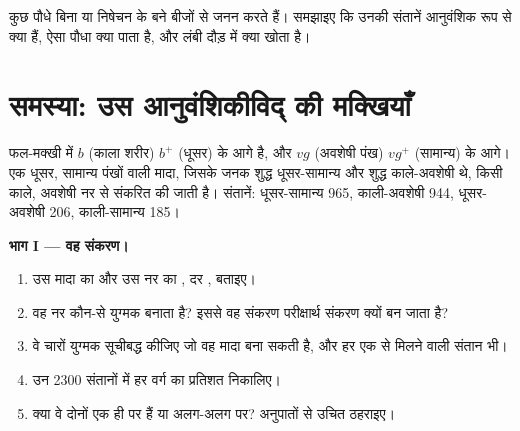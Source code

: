 \begin{exercise}[$\star\star\star$]\label{exo:g12:meiosis-genetic-shuffling:15}
कुछ पौधे बिना  या निषेचन के बने बीजों से जनन करते हैं।
समझाइए कि उनकी संतानें आनुवंशिक रूप से क्या हैं, ऐसा पौधा क्या पाता है, और
लंबी दौड़ में क्या खोता है।
\end{exercise}

\section{समस्या: उस आनुवंशिकीविद् की मक्खियाँ}

\begin{problem}
\label{pb:g12:meiosis-genetic-shuffling:1}
फल-मक्खी में  $b$ (काला शरीर) $b^+$ (धूसर) के आगे  है,
और $vg$ (अवशेषी पंख) $vg^+$ (सामान्य) के आगे। एक धूसर, सामान्य पंखों वाली
मादा, जिसके जनक शुद्ध धूसर-सामान्य और शुद्ध काले-अवशेषी थे, किसी काले,
अवशेषी नर से संकरित की जाती है। संतानें: धूसर-सामान्य 965, काली-अवशेषी 944,
धूसर-अवशेषी 206, काली-सामान्य 185।

\medskip
\noindent\textbf{भाग I --- वह संकरण।}
\begin{enumerate}
  \item उस मादा का और उस नर का ,  दर , बताइए।
  \item वह नर कौन-से युग्मक बनाता है? इससे वह संकरण परीक्षार्थ संकरण क्यों
        बन जाता है?
  \item वे चारों युग्मक सूचीबद्ध कीजिए जो वह मादा बना सकती है, और हर एक से
        मिलने वाली संतान भी।
  \item उन 2300 संतानों में हर वर्ग का प्रतिशत निकालिए।
  \item क्या वे दोनों  एक ही  पर हैं या अलग-अलग पर? अनुपातों से
        उचित ठहराइए।
\end{enumerate}


\end{problem}
